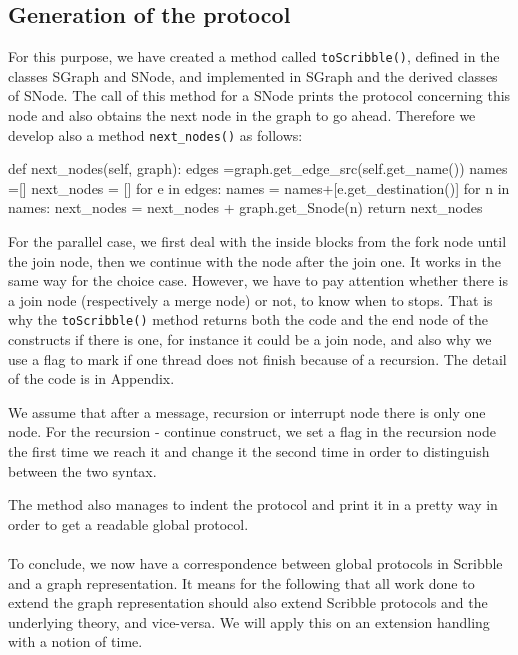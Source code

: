 \documentclass[a4paper,11pt,twoside]{report}
\begin{document}
\subsection{Generation of the protocol}
For this purpose, we have created a method called \texttt{toScribble()}, defined in the classes SGraph and SNode, and implemented in SGraph and the derived classes of SNode. The call of this method for a SNode prints the protocol concerning this node and also obtains the next node in the graph to go ahead. Therefore we develop also a method \texttt{next\_nodes()} as follows:
\begin{SJLISTING}
def next_nodes(self, graph):
        edges =graph.get_edge_src(self.get_name())
        names =[]
        next_nodes = []
        for e in edges:
            names = names+[e.get_destination()]
        for n in names:
            next_nodes = next_nodes + graph.get_Snode(n)
        return next_nodes
\end{SJLISTING}

For the parallel case, we first deal with the inside blocks from the fork node until the join node, then we continue with the node after the join one. It works in the same way for the choice case. However, we have to pay attention whether there is a join node (respectively a merge node) or not, to know when to stops. That is why the \texttt{toScribble()} method returns both the code and the end node of the constructs if there is one, for instance it could be a join node, and also why we use a flag to mark if one thread does not finish because of a recursion. The detail of the code is in Appendix.

We assume that after a message, recursion or interrupt node there is only one node. For the recursion - continue construct, we set a flag in the recursion node the first time we reach it and change it the second time in order to distinguish between the two syntax.

The method also manages to indent the protocol and print it in a pretty way in order to get a readable global protocol. 
~~\\
~~\\

To conclude, we now have a correspondence between global protocols in Scribble and a graph representation. It means for the following that all work done to extend the graph representation should also extend Scribble protocols and the underlying theory, and vice-versa. We will apply this on an extension handling with a notion of time.
\end{document}
